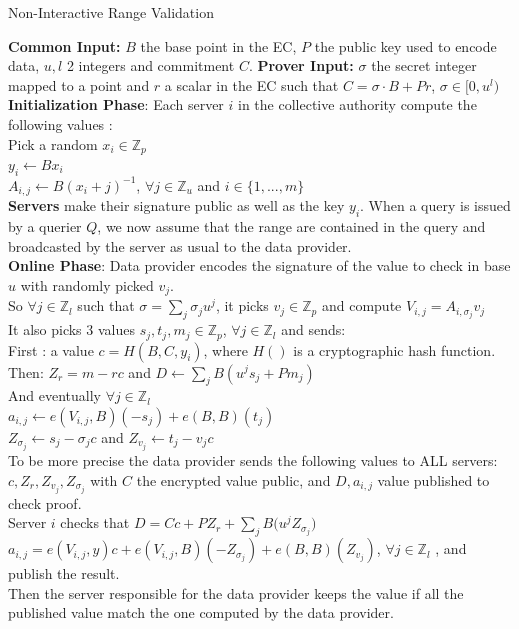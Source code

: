 \documentclass{article}
\begin{document}
\begin{algorithm}[H]
\caption{Non-Interactive Range Validation}\label{euclid}
\begin{algorithmic}[1]
\State \textbf{Common Input:} $B$ the base point in the EC, $P$ the public key used to encode data, $u, l$ 2 integers and commitment $C$.
\State \textbf{Prover Input:} $\sigma$ the secret integer mapped to a point and $r$ a scalar in the EC such that $C = \sigma \cdot B + Pr$, $\sigma \in [0,u^l)$\\

\State \textbf{Initialization Phase}: Each server $i$ in the collective authority compute the following values :\\
Pick a random $x_i \in \mathbb{Z}_p$\\
$y_i \gets Bx_i$\\
$A_{i,j} \gets B(x_i + j)^{-1} $, $\forall j \in \mathbb{Z}_u$ and $i \in \{1,...,m\}$\\
\State  \textbf{Servers} make their signature public as well as the key $y_i$. When a query is issued by a querier $Q$, we now assume that the range are contained in the query and broadcasted by the server as usual to the data provider.\\

\State \textbf{Online Phase}: Data provider encodes the signature of the value to check in base $u$ with randomly picked $v_j$.\\
So $\forall j \in \mathbb{Z}_l $ such that $ \sigma = \sum_{j}{\sigma_j u^j}$, it picks $v_j \in \mathbb{Z}_p$ and compute $V_{i,j} = A_{i,\sigma_j}v_j$\\
It also picks 3 values $s_j,t_j,m_j \in \mathbb{Z}_p $, $\forall j \in \mathbb{Z}_l$ and sends:\\
First : a value $c = H(B,C,y_i)$, where $H()$ is a cryptographic hash function.\\  Then: $Z_r = m-rc$ and $D \gets \sum_{j}{B(u^j s_j + Pm_j)}$\\
And eventually $ \forall j \in \mathbb{Z}_l$\\
$a_{i,j} \gets e(V_{i,j},B)(-s_j)+e(B,B)(t_j)$\\ $Z_{\sigma_j} \gets s_j-\sigma_j c$ and $Z_{v_j} \gets t_j-v_j c$\\
To be more precise the data provider sends the following values to ALL servers: $ c, Z_r, Z_{v_j}, Z_{\sigma_j}$ with $C$ the encrypted value public, and $D, a_{i,j}$ value published to check proof.\\

\State Server $i$ checks that $D = Cc + PZ_r + \sum_{j}{B(u^j Z_{\sigma_j}}) $\\
$a_{i,j} = e(V_{i,j},y)c + e(V_{i,j},B)(-Z_{\sigma_j}) + e(B,B)(Z_{v_j})$, $\forall j \in \mathbb{Z}_l$ , and publish the result.\\

Then the server responsible for the data provider keeps the value if all the published value match the one computed by the data provider.
\end{algorithmic}
\end{algorithm}
\end{document}
